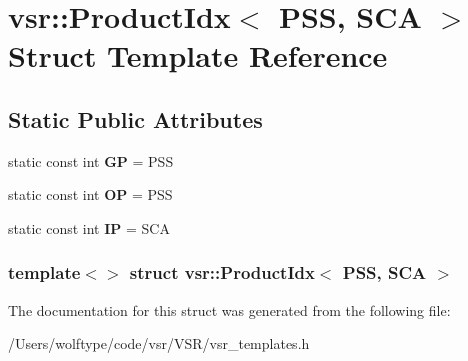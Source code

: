 \hypertarget{structvsr_1_1_product_idx_3_01_p_s_s_00_01_s_c_a_01_4}{\section{vsr\-:\-:Product\-Idx$<$ P\-S\-S, S\-C\-A $>$ Struct Template Reference}
\label{structvsr_1_1_product_idx_3_01_p_s_s_00_01_s_c_a_01_4}
}
\subsection*{Static Public Attributes}
\begin{DoxyCompactItemize}
\item 
\hypertarget{structvsr_1_1_product_idx_3_01_p_s_s_00_01_s_c_a_01_4_ac44569e06f60253b496d2ffd660171c2}{static const int {\bfseries G\-P} = P\-S\-S}\label{structvsr_1_1_product_idx_3_01_p_s_s_00_01_s_c_a_01_4_ac44569e06f60253b496d2ffd660171c2}

\item 
\hypertarget{structvsr_1_1_product_idx_3_01_p_s_s_00_01_s_c_a_01_4_ab5caf9c22ae72fcb50a87eaac155e573}{static const int {\bfseries O\-P} = P\-S\-S}\label{structvsr_1_1_product_idx_3_01_p_s_s_00_01_s_c_a_01_4_ab5caf9c22ae72fcb50a87eaac155e573}

\item 
\hypertarget{structvsr_1_1_product_idx_3_01_p_s_s_00_01_s_c_a_01_4_a17b6214fbc15e5800548b9072107e905}{static const int {\bfseries I\-P} = S\-C\-A}\label{structvsr_1_1_product_idx_3_01_p_s_s_00_01_s_c_a_01_4_a17b6214fbc15e5800548b9072107e905}

\end{DoxyCompactItemize}
\subsubsection*{template$<$$>$ struct vsr\-::\-Product\-Idx$<$ P\-S\-S, S\-C\-A $>$}



The documentation for this struct was generated from the following file\-:\begin{DoxyCompactItemize}
\item 
/\-Users/wolftype/code/vsr/\-V\-S\-R/vsr\-\_\-templates.\-h\end{DoxyCompactItemize}
